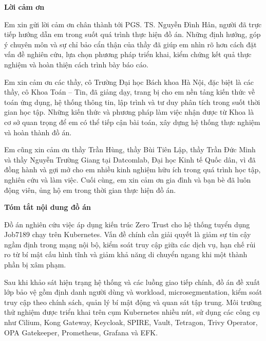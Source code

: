 
\clearpage
\thispagestyle{plain}
\begin{center}
    {\Large\bfseries Lời cảm ơn}
\end{center}

\begingroup
\small
{}

Em xin gửi lời cảm ơn chân thành tới PGS. TS. Nguyễn Đình Hân, người đã trực tiếp hướng dẫn em trong suốt quá trình thực hiện đồ án. Những định hướng, góp ý chuyên môn và sự chỉ bảo cẩn thận của thầy đã giúp em nhìn rõ hơn cách đặt vấn đề nghiên cứu, lựa chọn phương pháp triển khai, kiểm chứng kết quả thực nghiệm và hoàn thiện cách trình bày báo cáo.

Em xin cảm ơn các thầy, cô Trường Đại học Bách khoa Hà Nội, đặc biệt là các thầy, cô Khoa Toán -- Tin, đã giảng dạy, trang bị cho em nền tảng kiến thức về toán ứng dụng, hệ thống thông tin, lập trình và tư duy phân tích trong suốt thời gian học tập. Những kiến thức và phương pháp làm việc nhận được từ Khoa là cơ sở quan trọng để em có thể tiếp cận bài toán, xây dựng hệ thống thực nghiệm và hoàn thành đồ án.

Em cũng xin cảm ơn thầy Trần Hùng, thầy Bùi Tiên Lập, thầy Trần Đức Minh và thầy Nguyễn Trường Giang tại Datcomlab, Đại học Kinh tế Quốc dân, vì đã đồng hành và gợi mở cho em nhiều kinh nghiệm hữu ích trong quá trình học tập, nghiên cứu và làm việc. Cuối cùng, em xin cảm ơn gia đình và bạn bè đã luôn động viên, ủng hộ em trong thời gian thực hiện đồ án.

\vspace{0.35cm}

\begin{center}
    {\Large\bfseries Tóm tắt nội dung đồ án}
\end{center}

Đồ án nghiên cứu việc áp dụng kiến trúc Zero Trust cho hệ thống tuyển dụng Job7189 chạy trên Kubernetes. Vấn đề chính cần giải quyết là giảm sự tin cậy ngầm định trong mạng nội bộ, kiểm soát truy cập giữa các dịch vụ, hạn chế rủi ro từ bí mật cấu hình tĩnh và giảm khả năng di chuyển ngang khi một thành phần bị xâm phạm.

Sau khi khảo sát hiện trạng hệ thống và các luồng giao tiếp chính, đồ án đề xuất lớp bảo vệ gồm định danh người dùng và workload, microsegmentation, kiểm soát truy cập theo chính sách, quản lý bí mật động và quan sát tập trung. Môi trường thử nghiệm được triển khai trên cụm Kubernetes nhiều nút, sử dụng các công cụ như Cilium, Kong Gateway, Keycloak, SPIRE, Vault, Tetragon, Trivy Operator, OPA Gatekeeper, Prometheus, Grafana và EFK.

